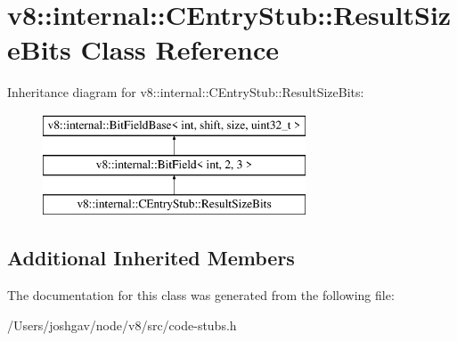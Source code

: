\hypertarget{classv8_1_1internal_1_1_c_entry_stub_1_1_result_size_bits}{}\section{v8\+:\+:internal\+:\+:C\+Entry\+Stub\+:\+:Result\+Size\+Bits Class Reference}
\label{classv8_1_1internal_1_1_c_entry_stub_1_1_result_size_bits}
Inheritance diagram for v8\+:\+:internal\+:\+:C\+Entry\+Stub\+:\+:Result\+Size\+Bits\+:\begin{figure}[H]
\begin{center}
\leavevmode
\includegraphics[height=3.000000cm]{classv8_1_1internal_1_1_c_entry_stub_1_1_result_size_bits}
\end{center}
\end{figure}
\subsection*{Additional Inherited Members}


The documentation for this class was generated from the following file\+:\begin{DoxyCompactItemize}
\item 
/\+Users/joshgav/node/v8/src/code-\/stubs.\+h\end{DoxyCompactItemize}
